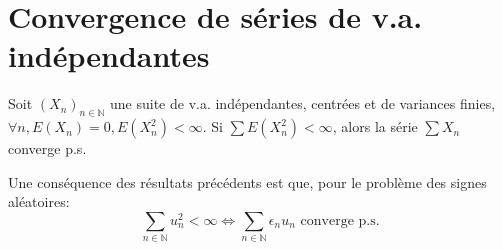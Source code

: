 \section{Convergence de séries de v.a. indépendantes}
\begin{theorem}
Soit $(X_n)_{n \in \mathbb{N}}$ une suite de v.a. indépendantes, centrées et de variances finies, $\forall n, E(X_n)=0, E(X_n^2) < \infty$.
Si $\sum E(X_n^2) < \infty$, alors la série $\sum X_n$ converge p.s.
\end{theorem}
Une conséquence des résultats précédents est que, pour le problème des signes aléatoires:
\[ \sum_{n \in \mathbb{N}} u_n^2 < \infty \iff \sum_{n \in \mathbb{N}} \epsilon_n u_n \text{ converge p.s.} \]